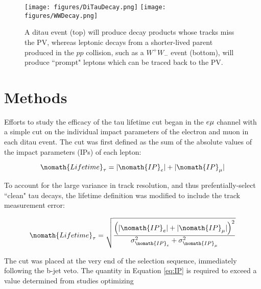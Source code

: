 \begin{figure}[tbh!]
\centering
\texttt{[image: figures/DiTauDecay.png]}
\texttt{[image: figures/WWDecay.png]}
\caption{A ditau event (top) will produce decay products whose tracks miss the PV, whereas leptonic decays from a shorter-lived parent produced in the $pp$ collision, such as a $W^+W_-$ event (bottom), will produce ``prompt" leptons which can be traced back to the PV.}
\label{fig:PromptVsTauDecay}
\end{figure}

\section{Methods}

Efforts to study the efficacy of the tau lifetime cut began in the $e\mu$ channel with a simple cut on the individual impact  parameters of the electron and muon in each ditau event. The cut was first defined as the sum of the absolute values of the impact parameters (IPs) of each lepton:

\begin{equation}

\nomath{Lifetime}_\tau = |\nomath{IP}_e| + |\nomath{IP}_\mu|

\end{equation}

\noindent To account for the large variance in track resolution, and thus prefentially-select ``clean" tau decays, the lifetime definition was modified to include the track measurement error:

\begin{equation}

\nomath{Lifetime}_\tau = \sqrt{\frac{\left(|\nomath{IP}_e| + |\nomath{IP}_\mu|\right)^2}{\sigma_{\nomath{IP}_e}^2 + \sigma_{\nomath{IP}_\mu}^2}}

\label{eq:IP}

\end{equation}

The cut was placed at the very end of the selection sequence, immediately following the b-jet veto. The quantity in Equation \ref{eq:IP} is required to exceed a value determined from studies optimizing 